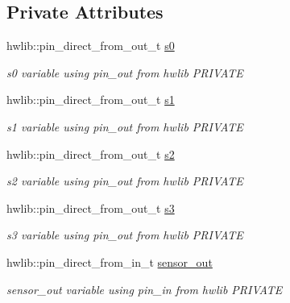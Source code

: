 \subsection*{Private Attributes}
\begin{DoxyCompactItemize}
\item 
\mbox{\label{classtcs3200_a846f95dec52105ab59a296fc67c20dcf}} 
hwlib\+::pin\+\_\+direct\+\_\+from\+\_\+out\+\_\+t \hyperlink{classtcs3200_a846f95dec52105ab59a296fc67c20dcf}{s0}
\begin{DoxyCompactList}\small\item\em s0 variable using pin\+\_\+out from hwlib P\+R\+I\+V\+A\+TE \end{DoxyCompactList}\item 
\mbox{\label{classtcs3200_abfbf91180c3608fd9bb54719123923a4}} 
hwlib\+::pin\+\_\+direct\+\_\+from\+\_\+out\+\_\+t \hyperlink{classtcs3200_abfbf91180c3608fd9bb54719123923a4}{s1}
\begin{DoxyCompactList}\small\item\em s1 variable using pin\+\_\+out from hwlib P\+R\+I\+V\+A\+TE \end{DoxyCompactList}\item 
\mbox{\label{classtcs3200_a1a1db3ebd11d9fb7cd01e20eacace27c}} 
hwlib\+::pin\+\_\+direct\+\_\+from\+\_\+out\+\_\+t \hyperlink{classtcs3200_a1a1db3ebd11d9fb7cd01e20eacace27c}{s2}
\begin{DoxyCompactList}\small\item\em s2 variable using pin\+\_\+out from hwlib P\+R\+I\+V\+A\+TE \end{DoxyCompactList}\item 
\mbox{\label{classtcs3200_abf50b62964b73ad7383bc0f7dd383ccc}} 
hwlib\+::pin\+\_\+direct\+\_\+from\+\_\+out\+\_\+t \hyperlink{classtcs3200_abf50b62964b73ad7383bc0f7dd383ccc}{s3}
\begin{DoxyCompactList}\small\item\em s3 variable using pin\+\_\+out from hwlib P\+R\+I\+V\+A\+TE \end{DoxyCompactList}\item 
\mbox{\label{classtcs3200_a522640671fdac5ab30f08363cd6306aa}} 
hwlib\+::pin\+\_\+direct\+\_\+from\+\_\+in\+\_\+t \hyperlink{classtcs3200_a522640671fdac5ab30f08363cd6306aa}{sensor\+\_\+out}
\begin{DoxyCompactList}\small\item\em sensor\+\_\+out variable using pin\+\_\+in from hwlib P\+R\+I\+V\+A\+TE \end{DoxyCompactList}\end{DoxyCompactItemize}



